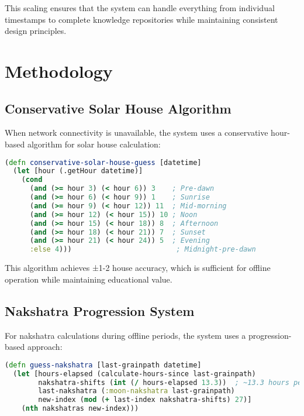 \documentclass[11pt]{article}
\begin{document}
This scaling ensures that the system can handle everything from individual timestamps to complete knowledge repositories while maintaining consistent design principles.

\section{Methodology}

\subsection{Conservative Solar House Algorithm}

When network connectivity is unavailable, the system uses a conservative hour-based algorithm for solar house calculation:

\begin{lstlisting}[language=Clojure, caption=Conservative Solar House Algorithm]
(defn conservative-solar-house-guess [datetime]
  (let [hour (.getHour datetime)]
    (cond
      (and (>= hour 3) (< hour 6)) 3    ; Pre-dawn
      (and (>= hour 6) (< hour 9)) 1    ; Sunrise
      (and (>= hour 9) (< hour 12)) 11  ; Mid-morning
      (and (>= hour 12) (< hour 15)) 10 ; Noon
      (and (>= hour 15) (< hour 18)) 8  ; Afternoon
      (and (>= hour 18) (< hour 21)) 7  ; Sunset
      (and (>= hour 21) (< hour 24)) 5  ; Evening
      :else 4)))                         ; Midnight-pre-dawn
\end{lstlisting}

This algorithm achieves ±1-2 house accuracy, which is sufficient for offline operation while maintaining educational value.

\subsection{Nakshatra Progression System}

For nakshatra calculations during offline periods, the system uses a progression-based approach:

\begin{lstlisting}[language=Clojure, caption=Nakshatra Progression Algorithm]
(defn guess-nakshatra [last-grainpath datetime]
  (let [hours-elapsed (calculate-hours-since last-grainpath)
        nakshatra-shifts (int (/ hours-elapsed 13.3))  ; ~13.3 hours per nakshatra
        last-nakshatra (:moon-nakshatra last-grainpath)
        new-index (mod (+ last-index nakshatra-shifts) 27)]
    (nth nakshatras new-index)))
\end{lstlisting}
\end{document}
